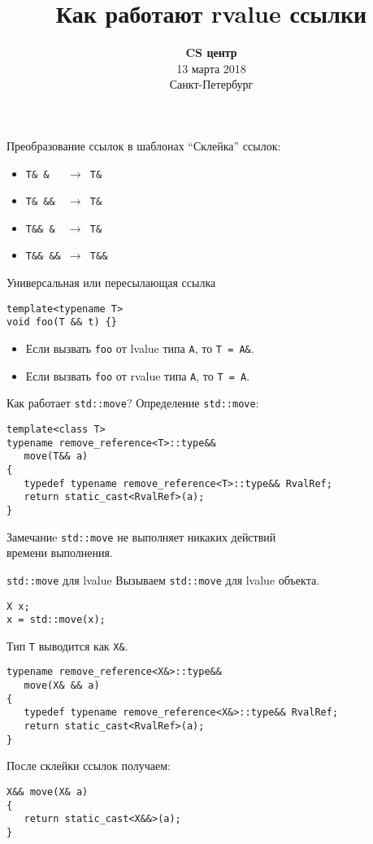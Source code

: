 \documentclass{beamer}
\title{Как работают rvalue ссылки}
\date{
   \textbf{CS центр}\\
   13 марта 2018 \\
   Санкт-Петербург
}
\begin{document}
\begin{frame} 
  \titlepage
\end{frame}

\begin{frame}[fragile]{Преобразование ссылок в шаблонах}
    ``Склейка'' ссылок:
    \begin{itemize}
    \item \texttt{T\& \&\ \ \ $\to$ T\&}
    \item \texttt{T\& \&\&\ \  $\to$ T\&}
    \item \texttt{T\&\& \&\ \  $\to$ T\&}
    \item \texttt{T\&\& \&\&\  $\to$ T\&\&}
    \end{itemize}

\begin{block}{Универсальная или пересылающая ссылка}
\begin{lstlisting}
template<typename T>
void foo(T && t) {}
\end{lstlisting}
\begin{itemize}
    \item Если вызвать {\tt foo} от lvalue типа {\tt A}, то {\tt T = A\&}.
    \item Если вызвать {\tt foo} от rvalue типа {\tt A}, то {\tt T = A}.
\end{itemize}
\end{block}
\end{frame}

\begin{frame}[fragile]{Как работает {\tt std::move}?}
Определение \texttt{std::move}:
\begin{lstlisting}
template<class T> 
typename remove_reference<T>::type&&
   move(T&& a) 
{
   typedef typename remove_reference<T>::type&& RvalRef;
   return static_cast<RvalRef>(a);
}  
    \end{lstlisting}


\begin{block}{Замечаниe}
    \texttt{std::move} не выполняет никаких действий\\
    времени выполнения.
\end{block}
\end{frame}

\begin{frame}[fragile]{{\tt std::move} для lvalue}
Вызываем \texttt{std::move} для lvalue объекта.
\begin{lstlisting}
X x;
x = std::move(x);
\end{lstlisting}
Тип \texttt{T} выводится как \texttt{X\&}.
    \begin{lstlisting}
typename remove_reference<X&>::type&&
   move(X& && a) 
{
   typedef typename remove_reference<X&>::type&& RvalRef;
   return static_cast<RvalRef>(a);
} 
    \end{lstlisting}
После склейки ссылок получаем:
    \begin{lstlisting}
X&& move(X& a) 
{
   return static_cast<X&&>(a);
} 
    \end{lstlisting}
\end{frame}
\end{document}
